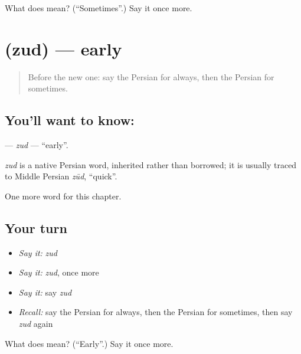 \begin{tcolorbox}[breakable,colback=teal!4,colframe=teal!35!black,title={Before you move on}]
What does  mean? (\textquotedblleft{}Sometimes\textquotedblright{}.) Say it once more.
\end{tcolorbox}
\section[\texorpdfstring{\fa{زود} (zud)}{زود (zud)}]{ (zud) — early}

\label{lesson:FA-C66-zud}



\begin{quote}
Before the new one: say the Persian for always, then the Persian for sometimes.
\end{quote}

\subsection*{You'll want to know: }
\textbf{} — \emph{zud} — \textquotedblleft{}early\textquotedblright{}.

\begin{cousinweb}
\emph{zud} is a native Persian word, inherited rather than borrowed; it is usually traced to Middle Persian \emph{zūd}, \textquotedblleft{}quick\textquotedblright{}.
\end{cousinweb}

\begin{grammarlens}[title={What you've built}]
One more word for this chapter.
\end{grammarlens}

\subsection*{Your turn}
\begin{itemize}
\raggedright
  \item \emph{Say it:} \emph{zud}
  \item \emph{Say it:} \emph{zud}, once more
  \item \emph{Say it:} say \emph{zud}
  \item \emph{Recall:} say the Persian for always, then the Persian for sometimes, then say \emph{zud} again
\end{itemize}

\begin{tcolorbox}[breakable,colback=teal!4,colframe=teal!35!black,title={Before you move on}]
What does  mean? (\textquotedblleft{}Early\textquotedblright{}.) Say it once more.
\end{tcolorbox}
